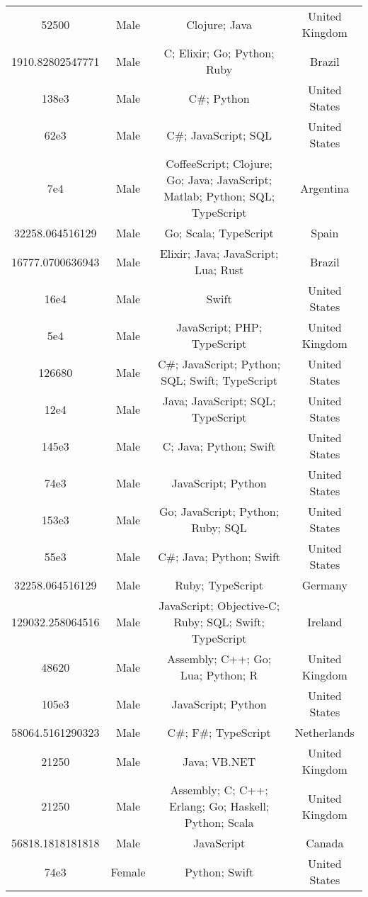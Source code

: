 \begin{center}
\begin{tabular}{ |c|c|c|c| }
52500  &  Male  &  Clojure; Java  &  United Kingdom  \\ 
1910.82802547771  &  Male  &  C; Elixir; Go; Python; Ruby  &  Brazil  \\ 
138e3  &  Male  &  C\#; Python  &  United States  \\ 
62e3  &  Male  &  C\#; JavaScript; SQL  &  United States  \\ 
7e4  &  Male  &  CoffeeScript; Clojure; Go; Java; JavaScript; Matlab; Python; SQL; TypeScript  &  Argentina  \\ 
32258.064516129  &  Male  &  Go; Scala; TypeScript  &  Spain  \\ 
16777.0700636943  &  Male  &  Elixir; Java; JavaScript; Lua; Rust  &  Brazil  \\ 
16e4  &  Male  &  Swift  &  United States  \\ 
5e4  &  Male  &  JavaScript; PHP; TypeScript  &  United Kingdom  \\ 
126680  &  Male  &  C\#; JavaScript; Python; SQL; Swift; TypeScript  &  United States  \\ 
12e4  &  Male  &  Java; JavaScript; SQL; TypeScript  &  United States  \\ 
145e3  &  Male  &  C; Java; Python; Swift  &  United States  \\ 
74e3  &  Male  &  JavaScript; Python  &  United States  \\ 
153e3  &  Male  &  Go; JavaScript; Python; Ruby; SQL  &  United States  \\ 
55e3  &  Male  &  C\#; Java; Python; Swift  &  United States  \\ 
32258.064516129  &  Male  &  Ruby; TypeScript  &  Germany  \\ 
129032.258064516  &  Male  &  JavaScript; Objective-C; Ruby; SQL; Swift; TypeScript  &  Ireland  \\ 
48620  &  Male  &  Assembly; C++; Go; Lua; Python; R  &  United Kingdom  \\ 
105e3  &  Male  &  JavaScript; Python  &  United States  \\ 
58064.5161290323  &  Male  &  C\#; F\#; TypeScript  &  Netherlands  \\ 
21250  &  Male  &  Java; VB.NET  &  United Kingdom  \\ 
21250  &  Male  &  Assembly; C; C++; Erlang; Go; Haskell; Python; Scala  &  United Kingdom  \\ 
56818.1818181818  &  Male  &  JavaScript  &  Canada  \\ 
74e3  &  Female  &  Python; Swift  &  United States  \\ 

\end{tabular}
\end{center}
